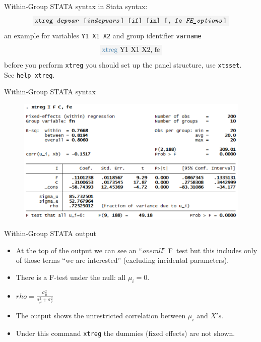 \begin{frame}{Within-Group STATA syntax}
	in Stata syntax:
		$$\colorbox{codegray}{\text{\texttt{xtreg \textit{depvar} [\textit{indepvars}] [if] [in] [, fe \textit{FE\_options}]}}}$$	
	an example for variables \colorbox{codegray}{\texttt{Y1 X1 X2}} and group identifier \colorbox{codegray}{\texttt{varname}}
		$$\colorbox{codegray}{\textcolor{codeblue}{xtreg} Y1 X1 X2, fe}$$
	before you perform \colorbox{codegray}{\textcolor{codeblue}{\texttt{xtreg}}} you should set up the panel structure, use \colorbox{codegray}{\texttt{xtsset}}.\\
		\medskip
	See \colorbox{codegray}{\textcolor{codeblue}{\texttt{help xtreg}.}}
\end{frame}
\begin{frame}{Within-Group STATA syntax}
	\begin{figure}
		\centering
			\includegraphics[width = 0.9\linewidth]{figures/panel_01.png}
	\end{figure}
\end{frame}
\begin{frame}{Within-Group STATA output}
	\begin{itemize}
		\item At the top of the output we can see an ``\textit{overall}'' F\ test but this includes only of those terms ``we are interested'' (excluding incidental parameters).
		\item There is a F-test under the null: all $\mu _{i}=0.$
		\item $rho=\frac{\sigma_{\mu }^{2}}{\sigma_{\mu}^{2}+\sigma_{\nu}^{2}}$
		\item The output shows the unrestricted correlation between $\mu_{i}$ and $X\prime s.$
		\item Under this command \texttt{xtreg} the dummies (fixed effects) are not shown.
	\end{itemize}
\end{frame}
